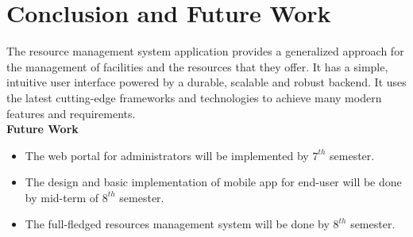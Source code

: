 \chapter{Conclusion and Future Work}
The resource management system application provides a generalized approach for the management of facilities and the resources that they offer. It has a simple, intuitive user interface powered by a durable, scalable and robust backend. It uses the latest cutting-edge frameworks and technologies to achieve many modern features and requirements. \\
\textbf{Future Work}
\begin{itemize}
    \item The web portal for administrators will be implemented by $7^{th}$ semester. 
    \item The design and basic implementation of mobile app for end-user will be done by mid-term of $8^{th}$ semester. 
    \item The full-fledged resources management system will be done by $8^{th}$ semester. 
\end{itemize}


